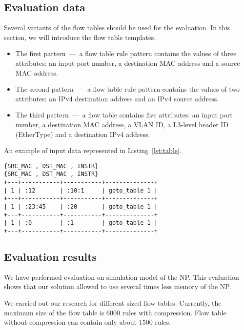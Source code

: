 \documentclass[conference]{IEEEtran}
\begin{document}
        \subsection{Evaluation data}
            Several variants of the flow tables should be used for the evaluation. 
            In this section, we will introduce the flow table templates.
            \begin{itemize}
                \item The first pattern~---~a flow table rule pattern contains the values of three attributes: 
                    an input port number, a destination MAC address and a source MAC address.
                \item The second pattern~---~a flow table rule pattern contains the values of two attributes: 
                    an IPv4 destination address and an IPv4 source address.
                \item The third pattern~---~a flow table contains five attributes: 
                    an input port number, a destination MAC address, a VLAN ID, a L3-level header ID (EtherType) and a destination IPv4 address.
            \end{itemize}
            An example of input data represented in Listing~\ref{lst:table}.
\begin{lstlisting}[float=htb,caption=Example of input data for input of a flow table,label=lst:table]
{SRC_MAC , DST_MAC , INSTR}
{SRC_MAC , DST_MAC , INSTR}
+---+-----------+-----------+--------------+
| 1 | :12       | :10:1     | goto_table 1 |
+---+-----------+-----------+--------------+
| 1 | :23:45    | :20       | goto_table 1 |
+---+-----------+-----------+--------------+
| 1 | :0        | :1        | goto_table 1 |
+---+-----------+-----------+--------------+
\end{lstlisting}
        \subsection{Evaluation results}
            We have performed evaluation on simulation model of the NP. 
            This evaluation shows that our solution allowed to use several times less memory of the NP.
            
            We carried out our research for different sized flow tables. 
            Currently, the maximum size of the flow table is 6000 rules with compression. 
            Flow table without compression can contain only about 1500 rules.
\end{document}
